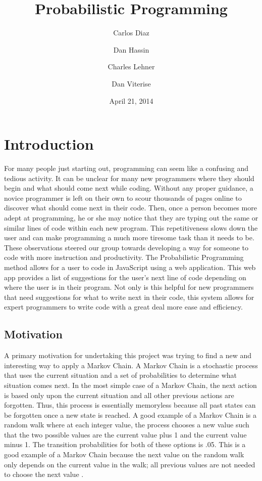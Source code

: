 \documentclass{article}
\title{
Probabilistic Programming
}
\author{
	Carlos Diaz
	\and
	Dan Hassin
	\and
	Charles Lehner
	\and
	Dan Viterise
}
\date{April 21, 2014}
\begin{document}
\maketitle


\section{Introduction}
For many people just starting out, programming can seem like a confusing and tedious activity. It can be unclear for 
many new programmers where they should begin and what should come next while coding. Without any proper guidance, 
a novice programmer is left on their own to scour thousands of pages online to discover what should come next in 
their code. Then, once a person becomes more adept at programming, he or she may notice that they are typing out 
the same or similar lines of code within each new program. This repetitiveness slows down the user and can make 
programming a much more tiresome task than it needs to be. These observations steered our group towards developing
a way for someone to code with more instruction and productivity. The Probabilistic Programming method allows for a user to code in JavaScript
using a web application. This web app provides a list of suggestions for the user's next line of code depending on where
the user is in their program. Not only is this helpful for new programmers that need suggestions for what to write next 
in their code, this system allows for expert programmers to write code with a great deal more ease and efficiency.

\subsection{Motivation}

A primary motivation for undertaking this project was trying to find a new and interesting way to apply a Markov Chain.
A Markov Chain is a stochastic process that uses the current situation and a set of probabilities to determine what 
situation comes next. In the most simple case of a Markov Chain, the next action is based only upon the current situation
and all other previous actions are forgotten. Thus, this process is essentially memoryless because all past states can
be forgotten once a new state is reached. A good example of a Markov Chain is a random walk where at each integer value,
the process chooses a new value such that the two possible values are the current value plus 1 and the current value
minus 1. The transition probabilities for both of these options is .05. This is a good example of a Markov Chain because
the next value on the random walk only depends on the current value in the walk; all previous values are not needed 
to choose the next value \cite{markov}. 
\end{document}
